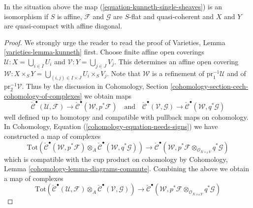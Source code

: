 %
\begin{lemma}
\label{lemma-kunneth-single-sheaf}
In the situation above the map (\ref{equation-kunneth-single-sheaves}) is an
isomorphism if $S$ is affine, $\mathcal{F}$ and $\mathcal{G}$ are $S$-flat and
quasi-coherent and $X$ and $Y$ are quasi-compact with affine diagonal.
\end{lemma}

\begin{proof}
We strongly urge the reader to read the proof of
Varieties, Lemma \ref{varieties-lemma-kunneth} first.
Choose finite affine open coverings
$\mathcal{U} : X = \bigcup_{i \in I} U_i$ and
$\mathcal{V} : Y = \bigcup_{j \in J} V_j$.
This determines an affine open covering
$\mathcal{W} : X \times_S Y = \bigcup_{(i, j) \in I \times J} U_i \times_S V_j$.
Note that $\mathcal{W}$ is a refinement of
$\text{pr}_1^{-1}\mathcal{U}$ and of $\text{pr}_2^{-1}\mathcal{V}$.
Thus by the discussion in Cohomology, Section
\ref{cohomology-section-cech-cohomology-of-complexes}
we obtain maps
$$
\check{\mathcal{C}}^\bullet(\mathcal{U}, \mathcal{F})
\to
\check{\mathcal{C}}^\bullet(\mathcal{W}, p^*\mathcal{F})
\quad\text{and}\quad
\check{\mathcal{C}}^\bullet(\mathcal{V}, \mathcal{G})
\to
\check{\mathcal{C}}^\bullet(\mathcal{W}, q^*\mathcal{G})
$$
well defined up to homotopy and compatible with pullback maps on cohomology.
In Cohomology, Equation (\ref{cohomology-equation-needs-signs})
we have constructed a map of complexes
$$
\text{Tot}(
\check{\mathcal{C}}^\bullet(\mathcal{W}, p^*\mathcal{F})
\otimes_A
\check{\mathcal{C}}^\bullet(\mathcal{W}, q^*\mathcal{G}))
\longrightarrow
\check{\mathcal{C}}^\bullet(\mathcal{W},
p^*\mathcal{F} \otimes_{\mathcal{O}_{X \times_S Y}}
q^*\mathcal{G})
$$
which is compatible with the cup product on cohomology by
Cohomology, Lemma \ref{cohomology-lemma-diagrams-commute}.
Combining the above we obtain a map of complexes
\begin{equation}
\label{equation-kunneth-on-cech}
\text{Tot}(
\check{\mathcal{C}}^\bullet(\mathcal{U}, \mathcal{F})
\otimes_A
\check{\mathcal{C}}^\bullet(\mathcal{V}, \mathcal{G}))
\to
\check{\mathcal{C}}^\bullet(\mathcal{W},
p^*\mathcal{F}
\otimes_{\mathcal{O}_{X \times_S Y}}
q^*\mathcal{G})
\end{equation}

\end{proof}

